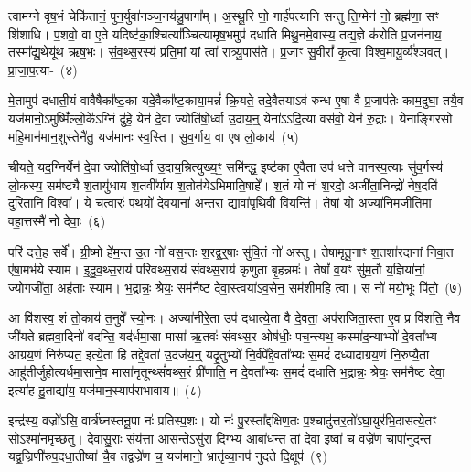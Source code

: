 {}

त्वाम॑ग्ने वृष॒भं चेकि॑तानं॒ पुन॒र्युवा॑नञ्ज॒नय॑न्नु॒पागा᳚म्। अ॒स्थू॒रि णो॒ गार्\mbox{}ह॑पत्यानि सन्तु ति॒ग्मेन॑ नो॒ ब्रह्म॑णा॒ सꣳ शि॑शाधि। प॒शवो॒ वा ए॒ते यदिष्ट॑का॒श्चित्या᳚ञ्चित्यामृष॒भमुप॑ दधाति मिथु॒नमे॒वास्य॒ तद्य॒ज्ञे क॑रोति प्र॒जन॑नाय॒ तस्मा᳚द्\-यू॒थेयू॑थ ऋष॒भः। सं॒व॒थ्स॒रस्य॑ प्रति॒मां यां त्वा॑ रात्र्यु॒पास॑ते। प्र॒जाꣳ सु॒वीरां᳚ कृ॒त्वा विश्व॒मायु॒र्व्य॑श्ञवत्। प्रा॒जा॒प॒त्या-~(४)\ip

मे॒तामुप॑ दधाती॒यं वावैषैका᳚ष्ट॒का यदे॒वैका᳚ष्ट॒काया॒मन्नं॑ क्रि॒यते॒ तदे॒वैतया\-ऽव॑ रुन्ध ए॒षा वै प्र॒जा\-प॑तेः काम॒दुघा॒ तयै॒व यज॑मानो॒\-ऽमुष्मिँ॑ल्लो॒के᳚\-ऽग्निं दु॑हे॒ येन॑ दे॒वा ज्योति॑षो॒र्ध्वा उ॒दाय॒न्॒ येना॑\-ऽऽदि॒त्या वस॑वो॒ येन॑ रु॒द्राः। येनाङ्गि॑रसो महि॒मान॑मान॒शुस्तेनै॑तु॒ यज॑मानः स्व॒स्ति। सु॒व॒र्गाय॒ वा ए॒ष लो॒काय॑~(५)\ip

चीयते॒ यद॒ग्निर्येन॑ दे॒वा ज्योति॑षो॒र्ध्वा उ॒दाय॒न्नित्युख्य॒ꣳ॒ समि॑न्द्ध॒ इष्ट॑का ए॒वैता उप॑ धत्ते वानस्प॒त्याः सु॑व॒र्गस्य॑ लो॒कस्य॒ सम॑ष्ट्यै श॒तायु॑धाय श॒तवी᳚र्याय श॒तोत॑ये\-ऽभिमाति॒षाहे᳚। श॒तं यो नः॑ श॒रदो॒ अजी॑ता॒निन्द्रो॑ नेष॒दति॑ दुरि॒तानि॒ विश्वा᳚। ये च॒त्वारः॑ प॒थयो॑ देव॒याना॑ अन्त॒रा द्यावा॑\-पृथि॒वी वि॒यन्ति॑। तेषां॒ यो अज्या॑नि॒मजी॑तिमा॒ वहा॒त्तस्मै॑ नो देवाः॒~(६)\ip

परि॑ दत्ते॒ह सर्वे᳚। ग्री॒ष्मो हे॑म॒न्त उ॒त नो॑ वस॒न्तः श॒रद्व॒र्॒\mbox{}षाः सु॑वि॒तं नो॑ अस्तु। तेषा॑मृतू॒नाꣳ श॒तशा॑रदानां निवा॒त ए॑षा॒मभ॑ये स्याम। इ॒दु॒व॒थ्स॒राय॑ परिवथ्स॒राय॑ संवथ्स॒राय॑ कृणुता बृ॒हन्नमः॑। तेषां᳚ व॒यꣳ सु॑म॒तौ य॒ज्ञिया॑नां॒ ज्योगजी॑ता॒ अह॑ताः स्याम। भ॒द्रान्नः॒ श्रेयः॒ सम॑नैष्ट देवा॒स्त्वया॑\-ऽव॒सेन॒ सम॑शीमहि त्वा। स नो॑ मयो॒भूः पि॑तो॒~(७)\ip

आ वि॑शस्व॒ शं तो॒काय॑ त॒नुवे᳚ स्यो॒नः। अज्या॑नीरे॒ता उप॑ दधात्ये॒ता वै दे॒वता॒ अप॑राजिता॒स्ता ए॒व प्र वि॑शति॒ नैव जी॑यते ब्रह्मवा॒दिनो॑ वदन्ति॒ यद॑र्धमा॒सा मासा॑ ऋ॒तवः॑ संवथ्स॒र ओष॑धीः॒ पच॒न्त्यथ॒ कस्मा॑द॒न्याभ्यो॑ दे॒वता᳚भ्य आग्रय॒णं निरु॑प्यत॒ इत्ये॒ता हि तद्दे॒वता॑ उ॒दज॑य॒न्॒ यदृ॒तुभ्यो॑ नि॒र्वपे᳚द्दे॒वता᳚भ्यः स॒मदं॑ दध्यादाग्रय॒णं नि॒रुप्यै॒ता आहु॑तीर्जुहोत्यर्धमा॒साने॒व मासा॑नृ॒तून्थ्सं॑वथ्स॒रं प्री॑णाति॒ न दे॒वता᳚भ्यः स॒मदं॑ दधाति भ॒द्रान्नः॒ श्रेयः॒ सम॑नैष्ट देवा॒ इत्या॑ह हु॒ताद्या॑य॒ यज॑मान॒स्याप॑राभावाय॥~(८)\ip

{\anuvakamend[{प्रा॒जा॒प॒त्यां लो॒काय॑ देवाः पितो दध्यादाग्रय॒णं पञ्च॑विꣳशतिश्च}]}

इन्द्र॑स्य॒ वज्रो॑\-ऽसि॒ वार्त्र॑घ्नस्तनू॒पा नः॑ प्रतिस्प॒शः। यो नः॑ पु॒रस्ता᳚द्दक्षिण॒तः प॒श्चादु॑त्तर॒तो॑\-ऽघा॒युर॑भि॒दास॑त्ये॒तꣳ सो\-ऽश्मा॑नमृच्छतु। दे॒वा॒सु॒राः संय॑त्ता आस॒न्ते\-ऽसु॑रा दि॒ग्भ्य आबा॑धन्त॒ तां दे॒वा इष्वा॑ च॒ वज्रे॑ण॒ चापा॑नुदन्त॒ यद्व॒ज्रिणी॑रुप॒दधा॒तीष्वा॑ चै॒व तद्वज्रे॑ण च॒ यज॑मानो॒ भ्रातृ॑व्या॒नप॑ नुदते दि॒क्षूप॑~(९)\ip

